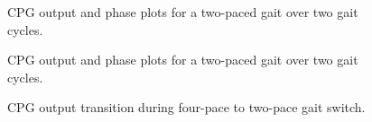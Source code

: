 			\begin{figure}[h!]
				\centering
				\caption{CPG output and phase plots for a two-paced gait over two gait cycles.}
				\label{fig::cpg_phase2_45}
			\end{figure}
			\begin{figure}[h!]
				\centering
				\caption{CPG output and phase plots for a two-paced gait over two gait cycles.}
				\label{fig::cpg_phase4_45}
			\end{figure}
			\begin{figure}[h!]
				\centering
				\caption{CPG output transition during four-pace to two-pace gait switch.}
				\label{fig::cpg_transition}
			\end{figure}	%



